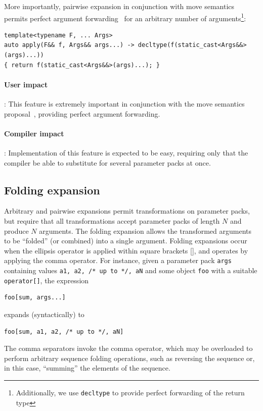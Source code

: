 \documentclass{article}
\begin{document}
More importantly, pairwise expansion in conjunction with move
semantics~\cite{Hinnant02} permits perfect argument
forwarding~\cite{Dimov02} for an arbitrary number of
arguments\footnote{Additionally, we use \texttt{decltype} to provide
  perfect forwarding of the return type}:

\begin{verbatim}
template<typename F, ... Args>
auto apply(F&& f, Args&& args...) -> decltype(f(static_cast<Args&&>(args)...))
{ return f(static_cast<Args&&>(args)...); }
\end{verbatim}

\paragraph{User impact}: This feature is extremely important in
conjunction with the move semantics proposal~\cite{Hinnant02},
providing perfect argument forwarding. 

\paragraph{Compiler impact}: Implementation of this feature is
expected to be easy, requiring only that the compiler
be able to substitute for several parameter packs at once.

\subsection{Folding expansion}
Arbitrary and pairwise expansions permit transformations on parameter
packs, but require that all transformations accept parameter packs of
length $N$ and produce $N$ arguments. The folding expansion allows the
transformed arguments to be ``folded'' (or combined) into a single
argument. Folding expansions occur when the ellipsis operator is
applied within square brackets [], and operates by applying the comma
operator. For instance, given a parameter pack \texttt{args}
containing values \texttt{a1, a2, /* up to */, aN} and some
object \texttt{foo} with a suitable \texttt{operator[]}, the
expression
\begin{verbatim}
foo[sum, args...]
\end{verbatim}

expands (syntactically) to 

\begin{verbatim}
foo[sum, a1, a2, /* up to */, aN]
\end{verbatim}

The comma separators invoke the comma operator, which may be
overloaded to perform arbitrary sequence folding operations, such as
reversing the sequence or, in this case, ``summing'' the elements of
the sequence. 
\end{document}

